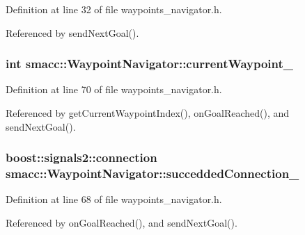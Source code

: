 Definition at line 32 of file waypoints\+\_\+navigator.\+h.



Referenced by send\+Next\+Goal().

\subsubsection[{\texorpdfstring{current\+Waypoint\+\_\+}{currentWaypoint_}}]{\setlength{\rightskip}{0pt plus 5cm}int smacc\+::\+Waypoint\+Navigator\+::current\+Waypoint\+\_\+\hspace{0.3cm}{\ttfamily [private]}}\hypertarget{classsmacc_1_1WaypointNavigator_a9a0102946593081338f7bd259f4670bc}{}\label{classsmacc_1_1WaypointNavigator_a9a0102946593081338f7bd259f4670bc}


Definition at line 70 of file waypoints\+\_\+navigator.\+h.



Referenced by get\+Current\+Waypoint\+Index(), on\+Goal\+Reached(), and send\+Next\+Goal().

\subsubsection[{\texorpdfstring{succedded\+Connection\+\_\+}{succeddedConnection_}}]{\setlength{\rightskip}{0pt plus 5cm}boost\+::signals2\+::connection smacc\+::\+Waypoint\+Navigator\+::succedded\+Connection\+\_\+\hspace{0.3cm}{\ttfamily [private]}}\hypertarget{classsmacc_1_1WaypointNavigator_a932d5378c3ef5bd4e8e3152ac657112f}{}\label{classsmacc_1_1WaypointNavigator_a932d5378c3ef5bd4e8e3152ac657112f}


Definition at line 68 of file waypoints\+\_\+navigator.\+h.



Referenced by on\+Goal\+Reached(), and send\+Next\+Goal().

